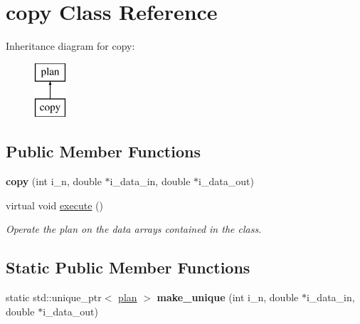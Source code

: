 \hypertarget{classcopy}{\section{copy Class Reference}
\label{classcopy}
}
Inheritance diagram for copy\-:\begin{figure}[H]
\begin{center}
\leavevmode
\includegraphics[height=2.000000cm]{classcopy}
\end{center}
\end{figure}
\subsection*{Public Member Functions}
\begin{DoxyCompactItemize}
\item 
\hypertarget{classcopy_a8d15bba6e30d137a18ad440df9647c62}{{\bfseries copy} (int i\-\_\-n, double $\ast$i\-\_\-data\-\_\-in, double $\ast$i\-\_\-data\-\_\-out)}\label{classcopy_a8d15bba6e30d137a18ad440df9647c62}

\item 
virtual void \hyperlink{classcopy_aab79ea3f2ca10478e63028b146f2e6dc}{execute} ()
\begin{DoxyCompactList}\small\item\em Operate the plan on the data arrays contained in the class. \end{DoxyCompactList}\end{DoxyCompactItemize}
\subsection*{Static Public Member Functions}
\begin{DoxyCompactItemize}
\item 
\hypertarget{classcopy_ae75a616e5fa5519d0f1f24dd23d27efc}{static std\-::unique\-\_\-ptr$<$ \hyperlink{classplan}{plan} $>$ {\bfseries make\-\_\-unique} (int i\-\_\-n, double $\ast$i\-\_\-data\-\_\-in, double $\ast$i\-\_\-data\-\_\-out)}\label{classcopy_ae75a616e5fa5519d0f1f24dd23d27efc}

\end{DoxyCompactItemize}
